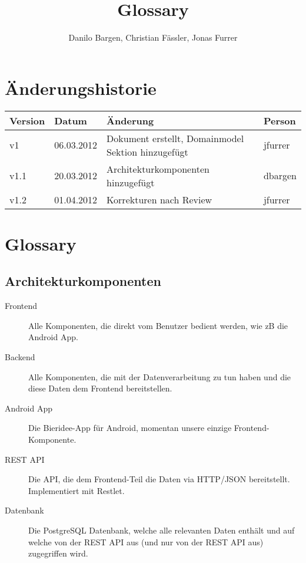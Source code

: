 \documentclass[10pt,a4paper]{scrartcl}
\author{Danilo Bargen, Christian Fässler, Jonas Furrer}
\title{Glossary}
\begin{document}
\begin{titlepage}
	\maketitle
	\vspace{120mm}
	\thispagestyle{empty} %
\end{titlepage}

\section{Änderungshistorie}
\begin{tabular}{p{}p{}p{}p{}}
\toprule
\textbf{Version} & \textbf{Datum} & \textbf{Änderung} & \textbf{Person} \\  
\midrule
v1 & 06.03.2012 & Dokument erstellt, Domainmodel Sektion hinzugefügt & jfurrer \\  
\hline
v1.1 & 20.03.2012 & Architekturkomponenten hinzugefügt & dbargen \\  
\hline 
v1.2 & 01.04.2012 & Korrekturen nach Review & jfurrer \\
\bottomrule
\end{tabular} 
\newpage


\section{Glossary}

\subsection{Architekturkomponenten}
\begin{description}
	\item[Frontend] Alle Komponenten, die direkt vom Benutzer bedient werden, wie zB die Android App.
	\item[Backend] Alle Komponenten, die mit der Datenverarbeitung zu tun haben und die diese Daten dem Frontend bereitstellen.
	\item[Android App] Die Bieridee-App für Android, momentan unsere einzige Frontend-Komponente.
	\item[REST API] Die API, die dem Frontend-Teil die Daten via HTTP/JSON bereitstellt. Implementiert mit Restlet.
	\item[Datenbank] Die PostgreSQL Datenbank, welche alle relevanten Daten enthält und auf welche von der REST API aus (und nur von der REST API aus) zugegriffen wird.
\end{description}
\end{document}

